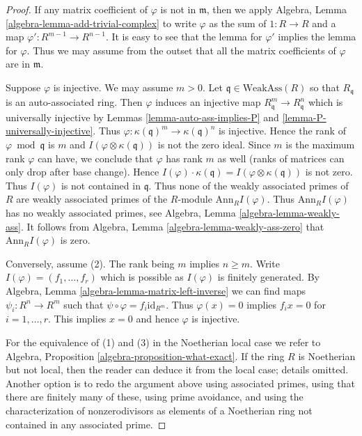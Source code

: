 \documentclass[10pt,a4paper]{amsart}
\theoremstyle{plain}
\theoremstyle{definition}
\theoremstyle{remark}
\numberwithin{equation}{subsection}
\begin{document}
\begin{proof}
If any matrix coefficient of $\varphi$ is not in $\mathfrak m$, then we apply
Algebra, Lemma \ref{algebra-lemma-add-trivial-complex}
to write $\varphi$ as the sum of $1 : R \to R$ and a map
$\varphi' : R^{m-1} \to R^{n-1}$. It is easy to see that
the lemma for $\varphi'$ implies the lemma for $\varphi$.
Thus we may assume from the outset that all the matrix
coefficients of $\varphi$ are in $\mathfrak m$.

\medskip\noindent
Suppose $\varphi$ is injective. We may assume $m > 0$.
Let $\mathfrak q \in \text{WeakAss}(R)$ so that $R_\mathfrak q$
is an auto-associated ring. Then $\varphi$
induces an injective map $R_\mathfrak q^m \to R_\mathfrak q^n$
which is universally injective by
Lemmas \ref{lemma-auto-ass-implies-P} and \ref{lemma-P-universally-injective}.
Thus $\varphi : \kappa(\mathfrak q)^m \to \kappa(\mathfrak q)^n$
is injective. Hence the rank of $\varphi \bmod \mathfrak q$ is $m$ and
$I(\varphi \otimes \kappa(\mathfrak q))$ is not the zero ideal.
Since $m$ is the maximum rank $\varphi$ can have, we conclude
that $\varphi$ has rank $m$ as well (ranks of matrices
can only drop after base change). Hence
$I(\varphi) \cdot \kappa(\mathfrak q) =
I(\varphi \otimes \kappa(\mathfrak q))$ is not zero.
Thus $I(\varphi)$ is not contained in $\mathfrak q$.
Thus none of the weakly associated primes of $R$
are weakly associated primes of the $R$-module
$\text{Ann}_R I(\varphi)$. Thus $\text{Ann}_R I(\varphi)$
has no weakly associated primes, see
Algebra, Lemma \ref{algebra-lemma-weakly-ass}.
It follows from Algebra, Lemma
\ref{algebra-lemma-weakly-ass-zero}
that $\text{Ann}_R I(\varphi)$ is zero.

\medskip\noindent
Conversely, assume (2). The rank being $m$ implies $n \geq m$.
Write $I(\varphi) = (f_1, \ldots, f_r)$ which is possible as
$I(\varphi)$ is finitely generated. By
Algebra, Lemma \ref{algebra-lemma-matrix-left-inverse}
we can find maps $\psi_i : R^n \to R^m$ such that
$\psi \circ \varphi = f_i \text{id}_{R^m}$. Thus
$\varphi(x) = 0$ implies $f_i x = 0$ for $i = 1, \ldots, r$.
This implies $x = 0$ and hence $\varphi$ is injective.

\medskip\noindent
For the equivalence of (1) and (3) in the Noetherian local case
we refer to Algebra, Proposition \ref{algebra-proposition-what-exact}.
If the ring $R$ is Noetherian but not local, then the reader can
deduce it from the local case; details omitted.
Another option is to redo the argument above using associated
primes, using that there are finitely many of these, using
prime avoidance, and using the characterization of nonzerodivisors
as elements of a Noetherian ring not contained in any associated prime.
\end{proof}
\end{document}
